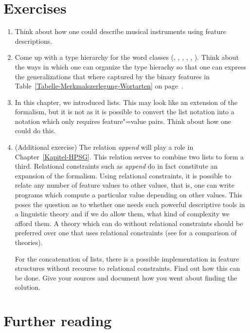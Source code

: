 \section*{Exercises}

\begin{enumerate}
\item Think about how one could describe musical instruments using feature descriptions.
\item Come up with a type hierarchy for the word classes (, , , ,
      , ). Think about the ways in which one can organize the type hierachy so that one
	  can express the generalizations that where captured by the binary features in Table~\ref{Tabelle-Merkmalszerlegung-Wortarten} on page~\pageref{Tabelle-Merkmalszerlegung-Wortarten}.
\item\label{ua-liste} In this chapter, we introduced lists. This may look like an extension of the formalism, but it is not as it is possible to
convert the list notation into a notation which only requires feature"=value pairs. Think about how one could do this.
\item (Additional exercise) The relation \emph{append} will play a role in Chapter~\ref{Kapitel-HPSG}. This relation serves to
combine two lists to form a third.
Relational constraints such as \emph{append} do in fact constitute an expansion of the formalism. Using relational constraints, it is possible to relate any number
of feature values to other values, that is, one can write programs which compute a particular value depending on other values. 
This poses the question as to whether one needs such powerful descriptive tools in a linguistic theory and if we do allow them, what kind of complexity we afford them.
A theory which can do without relational constraints should be preferred over one that uses
relational constraints (see   for a comparison of theories).

For the concatenation of lists, there is a possible implementation in feature structures without
recourse to relational constraints. Find out how this can be done. Give your sources and document
how you went about finding the solution.

\end{enumerate}


\section*{Further reading}

